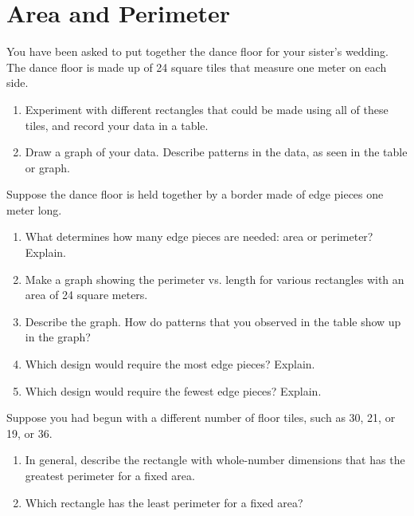 \newpage

\section{Area and Perimeter}

\begin{prob} You have been asked to put together the dance floor for your sister's wedding.  The dance floor is made up of 24 square tiles that measure one meter on each side. 
\begin{enumerate}
\item Experiment with different rectangles that could be made using all of these tiles, and record your data in a table.  
\item Draw a graph of your data.  Describe patterns in the data, as seen in the table or graph.  
\end{enumerate}
\end{prob}

\begin{prob} Suppose the dance floor is held together by a border made of edge pieces one meter long.  
\begin{enumerate}
\item What determines how many edge pieces are needed: area or perimeter?  Explain. 
\item Make a graph showing the perimeter vs. length for various rectangles with an area of 24 square meters.  
\item Describe the graph.  How do patterns that you observed in the table show up in the graph?  
\item Which design would require the most edge pieces?  Explain.  
\item Which design would require the fewest edge pieces?  Explain.
\end{enumerate}
\end{prob}

\begin{prob}
Suppose you had begun with a different number of floor tiles, such as 30, 21, or 19, or 36.  
\begin{enumerate}
\item In general, describe the rectangle with whole-number dimensions that has the greatest perimeter for a fixed area.  
\item Which rectangle has the least perimeter for a fixed area?
\end{enumerate}
\end{prob}

